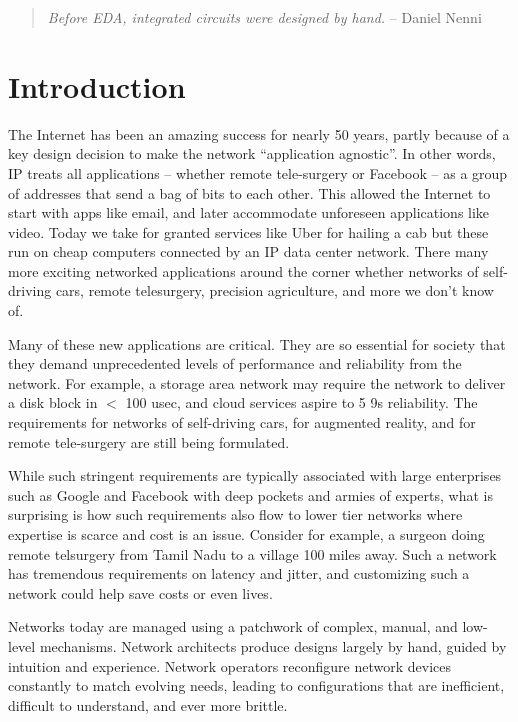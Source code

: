 \begin{quote}
{\em Before EDA, integrated circuits were designed by hand.} -- Daniel Nenni~\cite{wikicite}
\vspace{-2mm}
\end{quote}

\section{Introduction}

The Internet has been an amazing success for nearly 50 years, partly because of a key design decision to make the network “application agnostic”.   In other words, IP treats all applications – whether remote tele-surgery or Facebook – as a group of addresses that send a bag of bits to each other.  
This allowed the Internet to start with apps like email, and later accommodate unforeseen applications like video. Today we take for granted services like Uber for hailing a cab but these run on cheap computers connected by an IP data center network.  There many more exciting networked applications around the corner whether networks of self-driving cars, remote telesurgery, precision agriculture, and more we don’t know of.

Many of these new applications are critical.  They are so essential for society that they demand unprecedented levels of performance and reliability from the network.  For example, a storage area network may require the network to deliver a disk block in $<$ 100 usec, and cloud services aspire to 5 9s reliability.  The requirements for networks of self-driving cars, for augmented reality, and for remote tele-surgery are still being formulated.

While such stringent requirements are typically associated with large enterprises such as Google and Facebook with deep pockets and armies of experts, what is surprising is how such requirements also flow to lower tier networks where expertise is scarce and cost is an issue.  Consider for example, a surgeon doing remote telsurgery from Tamil Nadu to a village 100 miles away.  Such a network has tremendous requirements on latency and jitter, and customizing such a network could help save costs or even lives.

Networks today are managed using a patchwork of complex, manual, and low-level mechanisms. Network architects produce designs largely by hand, guided by intuition and experience. Network operators reconfigure network devices constantly to match evolving needs, leading to configurations that are inefficient, difficult to understand, and ever more brittle. 

